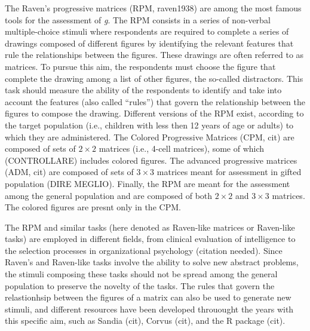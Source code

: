 The Raven's progressive matrices (RPM, raven1938) are among the most famous tools for the assessment of \emph{g}.
The RPM consists in a series of non-verbal multiple-choice stimuli where respondents are required to complete a series of drawings composed of different figures by identifying the relevant features that rule the relationships between the figures.
These drawings are often referred to as matrices.
To pursue this aim, the respondents must choose the figure that complete the drawing among a list of other figures, the so-called distractors.
This task should measure the ability of the respondents to identify and take into account the features (also called ``rules'') that govern the relationship between the figures to compose the drawing.
Different versions of the RPM exist, according to the target population (i.e., children with less then 12 years of age or adults) to which they are administered.
The Colored Progressive Matrices (CPM, cit) are composed of sets of \(2\times2\) matrices (i.e., 4-cell matrices), some of which (CONTROLLARE) includes colored figures.
The advanced progressive matrices (ADM, cit) are composed of sets of \(3\times3\) matrices meant for assessment in gifted population (DIRE MEGLIO).
Finally, the RPM are meant for the assessment among the general population and are composed of both \(2\times2\) and \(3\times3\) matrices.
The colored figures are presnt only in the CPM.

The RPM and similar tasks (here denoted as Raven-like matrices or Raven-like tasks) are employed in different fields, from clinical evaluation of intelligence to the selection processes in organizational psychology (citation needed).
Since Raven's and Raven-like tasks involve the ability to solve new abstract problems, the stimuli composing these tasks should not be spread among the general population to preserve the novelty of the tasks.
The rules that govern the relastionhsip between the figures of a matrix can also be used to generate new stimuli, and different resources have been developed throuought the years with this specific aim, such as Sandia (cit), Corvus (cit), and the R package  (cit).

